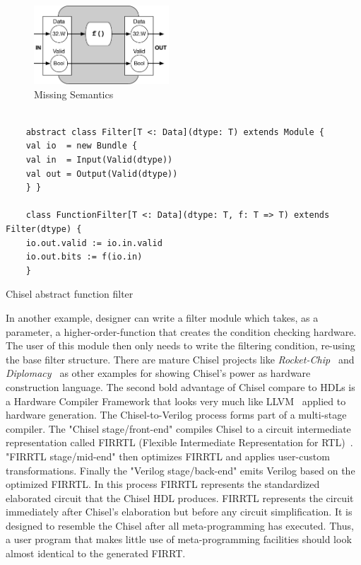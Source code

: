 \begin{figure}[h]
    \centering
    \includegraphics[width=0.45\textwidth]{figures/Introduction/Filter.pdf}
    \caption{Missing Semantics}
    \label{fig:filter}
\end{figure}


\begin{listing}[ht]
    \begin{verbatim}

    abstract class Filter[T <: Data](dtype: T) extends Module {
    val io  = new Bundle {
    val in  = Input(Valid(dtype))
    val out = Output(Valid(dtype))
    } }

    class FunctionFilter[T <: Data](dtype: T, f: T => T) extends Filter(dtype) {
    io.out.valid := io.in.valid
    io.out.bits := f(io.in)
    }

    \end{verbatim}
    \caption{Chisel abstract function filter}
    \label{listing:genesis2}
\end{listing}




In another example, designer can write a filter module which takes, as a parameter, a higher-order-function that creates the condition checking hardware.
The user of this module then only needs to write the filtering condition, re-using the base filter structure.
There are mature Chisel projects like \emph{Rocket-Chip~\cite{rocket-chip}} and \emph{Diplomacy~\cite{diplomacy}} as other examples for showing Chisel's power as hardware construction language.
The second bold advantage of Chisel compare to HDLs is a Hardware Compiler Framework that looks very much like LLVM~\cite{llvm} applied to hardware generation.
The Chisel-to-Verilog process forms part of a multi-stage compiler.
The "Chisel stage/front-end" compiles Chisel to a circuit intermediate representation called FIRRTL (Flexible Intermediate Representation for RTL)~\cite{firrtl}.
"FIRRTL stage/mid-end" then optimizes FIRRTL and applies user-custom transformations. Finally the "Verilog stage/back-end" emits Verilog based on the optimized FIRRTL.
In this process FIRRTL represents the standardized elaborated circuit that the Chisel HDL produces.
FIRRTL represents the circuit immediately after Chisel's elaboration but before any circuit simplification.
It is designed to resemble the Chisel after all meta-programming has executed. Thus, a user program that makes little use of meta-programming facilities should look almost identical to the generated FIRRT.

